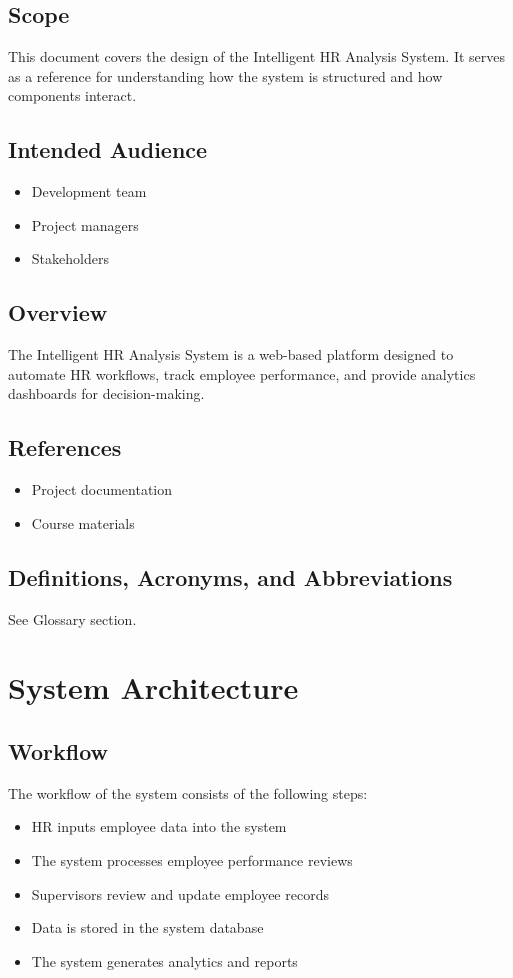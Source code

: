 \documentclass[12pt]{article}
\begin{document}
\subsection{Scope}
This document covers the design of the Intelligent HR Analysis System. It serves as a reference for understanding how the system is structured and how components interact.

\subsection{Intended Audience}
\begin{itemize}
\item Development team
\item Project managers
\item Stakeholders
\end{itemize}

\subsection{Overview}
The Intelligent HR Analysis System is a web-based platform designed to automate HR workflows, track employee performance, and provide analytics dashboards for decision-making.

\subsection{References}
\begin{itemize}
\item Project documentation
\item Course materials
\end{itemize}

\subsection{Definitions, Acronyms, and Abbreviations}
See Glossary section.

\section{System Architecture}

\subsection{Workflow}
The workflow of the system consists of the following steps:
\begin{itemize}
\item HR inputs employee data into the system
\item The system processes employee performance reviews
\item Supervisors review and update employee records
\item Data is stored in the system database
\item The system generates analytics and reports
\end{itemize}
\end{document}

